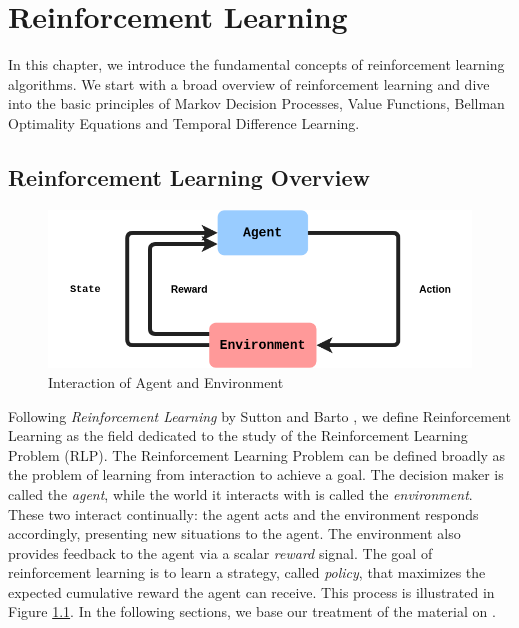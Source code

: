 \renewcommand{\S}{\mathcal{S}}
\newcommand{\A}{\mathcal{A}}
\newcommand{\R}{\mathcal{R}}
\newcommand{\M}{\mathcal{M}}
\renewcommand{\P}{\mathbb{P}}
\renewcommand{\E}{\mathbb{E}}

\chapter{Reinforcement Learning}\label{Ch:Reinforcement Learning}

In this chapter, we introduce the fundamental concepts of reinforcement learning algorithms. We start with a broad overview of reinforcement learning and dive into the basic principles of Markov Decision Processes, Value Functions, Bellman Optimality Equations and Temporal Difference Learning. 

\section{Reinforcement Learning Overview}\label{sec1}
\begin{figure}[h!]
\centering\includegraphics[scale=0.5,clip]{Graphics/RL_1.png}
\caption{Interaction of Agent and Environment}
\label{fig:RL_overview}
\end{figure}

Following \textit{Reinforcement Learning} by Sutton and Barto \cite{sutton1998reinforcement}, we define Reinforcement Learning as the field dedicated to the study of the Reinforcement Learning Problem (RLP). The Reinforcement Learning Problem can be defined broadly as the problem of learning from interaction to achieve a goal. The decision maker is called the \textit{agent}, while the world it interacts with is called the \textit{environment}. These two interact continually: the agent acts and the environment responds accordingly, presenting new situations to the agent. The environment also provides feedback to the agent via a scalar \textit{reward} signal. The goal of reinforcement learning is to learn a strategy, called \textit{policy}, that maximizes the expected cumulative reward the agent can receive. This process is illustrated in Figure \ref{fig:RL_overview}. In the following sections, we base our treatment of the material on \cite{szepesvari2010algorithms}. 

